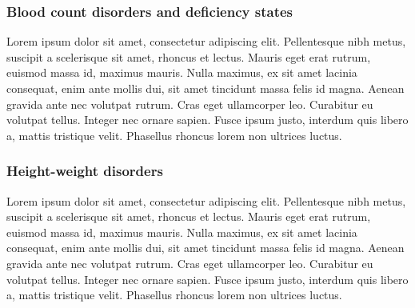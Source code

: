 \subsubsection{Blood count disorders and deficiency states}\label{sub:bloodcountdisorders}
Lorem ipsum dolor sit amet, consectetur adipiscing elit. Pellentesque nibh metus, suscipit a scelerisque sit amet, rhoncus et lectus. Mauris eget erat rutrum, euismod massa id, maximus mauris. Nulla maximus, ex sit amet lacinia consequat, enim ante mollis dui, sit amet tincidunt massa felis id magna. Aenean gravida ante nec volutpat rutrum. Cras eget ullamcorper leo. Curabitur eu volutpat tellus. Integer nec ornare sapien. Fusce ipsum justo, interdum quis libero a, mattis tristique velit. Phasellus rhoncus lorem non ultrices luctus.


\subsubsection{Height-weight disorders}\label{sub:heightweightdisorders}
Lorem ipsum dolor sit amet, consectetur adipiscing elit. Pellentesque nibh metus, suscipit a scelerisque sit amet, rhoncus et lectus. Mauris eget erat rutrum, euismod massa id, maximus mauris. Nulla maximus, ex sit amet lacinia consequat, enim ante mollis dui, sit amet tincidunt massa felis id magna. Aenean gravida ante nec volutpat rutrum. Cras eget ullamcorper leo. Curabitur eu volutpat tellus. Integer nec ornare sapien. Fusce ipsum justo, interdum quis libero a, mattis tristique velit. Phasellus rhoncus lorem non ultrices luctus.

